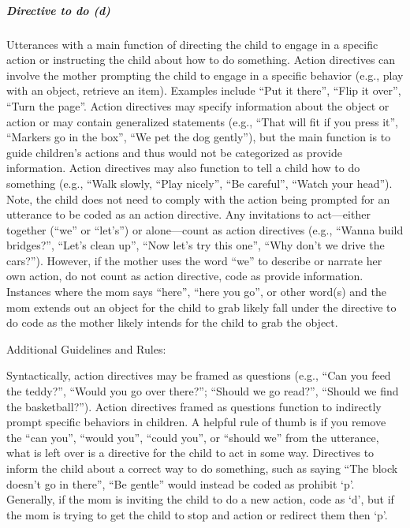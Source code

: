\documentclass[
  12pt,
]{book}
\begin{document}
\hypertarget{directive_to_do}{%
\subparagraph*{Directive to do (d)}\label{directive_to_do}}

Utterances with a main function of directing the child to engage in a specific action or instructing the child about how to do something. Action directives can involve the mother prompting the child to engage in a specific behavior (e.g., play with an object, retrieve an item). Examples include ``Put it there'', ``Flip it over'', ``Turn the page''.
Action directives may specify information about the object or action or may contain generalized statements (e.g., ``That will fit if you press it'', ``Markers go in the box'', ``We pet the dog gently''), but the main function is to guide children's actions and thus would not be categorized as provide information. Action directives may also function to tell a child how to do something (e.g., ``Walk slowly, ``Play nicely'', ``Be careful'', ``Watch your head''). Note, the child does not need to comply with the action being prompted for an utterance to be coded as an action directive.
Any invitations to act---either together (``we'' or ``let's'') or alone---count as action directives (e.g., ``Wanna build bridges?'', ``Let's clean up'', ``Now let's try this one'', ``Why don't we drive the cars?''). However, if the mother uses the word ``we'' to describe or narrate her own action, do not count as action directive, code as provide information.
Instances where the mom says ``here'', ``here you go'', or other word(s) and the mom extends out an object for the child to grab likely fall under the directive to do code as the mother likely intends for the child to grab the object.

Additional Guidelines and Rules:

Syntactically, action directives may be framed as questions (e.g., ``Can you feed the teddy?'', ``Would you go over there?''; ``Should we go read?'', ``Should we find the basketball?''). Action directives framed as questions function to indirectly prompt specific behaviors in children. A helpful rule of thumb is if you remove the ``can you'', ``would you'', ``could you'', or ``should we'' from the utterance, what is left over is a directive for the child to act in some way.
Directives to inform the child about a correct way to do something, such as saying ``The block doesn't go in there'', ``Be gentle'' would instead be coded as prohibit `p'. Generally, if the mom is inviting the child to do a new action, code as `d', but if the mom is trying to get the child to stop and action or redirect them then `p'.
\end{document}
